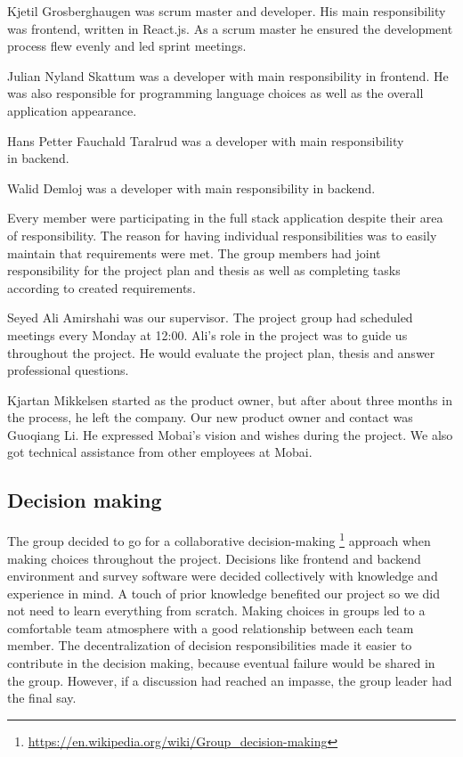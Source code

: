 Kjetil Grosberghaugen was scrum master and developer. His main responsibility was frontend, written in React.js. As a scrum master he ensured the development process flew evenly and led sprint meetings.

Julian Nyland Skattum was a developer with main responsibility in frontend. He was also responsible for programming language choices as well as the overall application appearance. 

Hans Petter Fauchald Taralrud was a developer with main responsibility\\ in backend. 

Walid Demloj was a developer with main responsibility in backend. 

Every member were participating in the full stack application despite their area of responsibility. The reason for having individual responsibilities was to easily maintain that requirements were met. The group members had joint responsibility for the project plan and thesis as well as completing tasks according to created requirements. 

Seyed Ali Amirshahi was our supervisor. The project group had scheduled meetings every Monday at 12:00. Ali's role in the project was to guide us throughout the project. He would evaluate the project plan, thesis and answer professional questions. 

Kjartan Mikkelsen started as the product owner, but after about three months in the process, he left the company. Our new product owner and contact was Guoqiang Li. He expressed Mobai's vision and wishes during the project. We also got technical assistance from other employees at Mobai. 

\subsection{Decision making}
The group decided to go for a collaborative decision-making \footnote{\url{https://en.wikipedia.org/wiki/Group_decision-making}} approach when making choices throughout the project. Decisions like frontend and backend environment and survey software were decided collectively with knowledge and experience in mind. A touch of prior knowledge benefited our project so we did not need to learn everything from scratch. Making choices in groups led to a comfortable team atmosphere with a good relationship between each team member. The decentralization of decision responsibilities made it easier to contribute in the decision making, because eventual failure would be shared in the group. However, if a discussion had reached an impasse, the group leader had the final say. 


